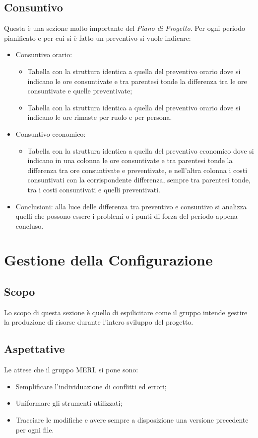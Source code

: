 \subsection{Consuntivo}
Questa è una sezione molto importante del \textit{Piano di Progetto}.
Per ogni periodo pianificato e per cui si è fatto un preventivo si vuole indicare:
\begin{itemize}
    \item Consuntivo orario:
        \begin{itemize}
            \item Tabella con la struttura identica a quella del preventivo orario dove si indicano le ore consuntivate e tra parentesi tonde la differenza tra le ore consuntivate e quelle preventivate;
            \item Tabella con la struttura identica a quella del preventivo orario dove si indicano le ore rimaste per ruolo e per persona.
        \end{itemize}
    \item Consuntivo economico:
        \begin{itemize}
            \item Tabella con la struttura identica a quella del preventivo economico dove si indicano in una colonna le ore consuntivate e tra parentesi tonde la differenza tra ore consuntivate e preventivate, e nell'altra colonna i costi consuntivati con la corrispondente differenza, sempre tra parentesi tonde, tra i costi consuntivati e quelli preventivati.
        \end{itemize}
    \item Conclusioni: alla luce delle differenza tra preventivo e consuntivo si analizza quelli che possono essere i problemi o i punti di forza del periodo appena concluso.
\end{itemize}


\section{Gestione della Configurazione}
\subsection{Scopo}
    Lo scopo di questa sezione è quello di espilicitare come il gruppo intende gestire la produzione di
    risorse durante l'intero sviluppo del progetto.
 \subsection{Aspettative}
    Le attese che il gruppo MERL si pone sono:
    \begin{itemize}
        \item Semplificare l'individuazione di conflitti ed errori;
        \item Uniformare gli strumenti utilizzati;
        \item Tracciare le modifiche e avere sempre a disposizione una versione precedente per ogni file.
    \end{itemize}
